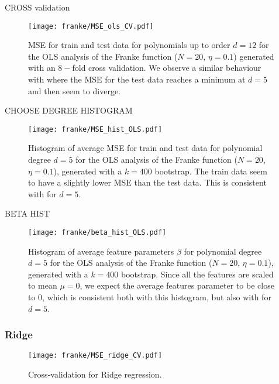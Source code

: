             
            CROSS validation 

            \begin{figure}
                \texttt{[image: franke/MSE\_ols\_CV.pdf]}
                \caption{MSE for train and test data for polynomials up to order $d=12$ for the OLS analysis of the Franke function ($N=20$, $\eta=0.1$) generated with an $8-$fold cross validation. We observe a similar behaviour with  where the MSE for the test data reaches a minimum at $d=5$ and then seem to diverge. }
                \label{fig:cross-validation_ols}
            \end{figure}
            
            CHOOSE DEGREE HISTOGRAM

            \begin{figure}
                \texttt{[image: franke/MSE\_hist\_OLS.pdf]}
                \caption{Histogram of average MSE for train and test data for polynomial degree $d=5$ for the OLS analysis of the Franke function ($N=20$, $\eta=0.1$), generated with a $k=400$ bootstrap. The train data seem to have a slightly lower MSE than the test data. This is consistent with  for $d=5$.}
                \label{fig:mse_hist_ols}
            \end{figure}

            BETA  HIST

            \begin{figure}
                \texttt{[image: franke/beta\_hist\_OLS.pdf]}
                \caption{Histogram of average feature parameters $\beta$ for polynomial degree $d=5$ for the OLS analysis of the Franke function ($N=20$, $\eta=0.1$), generated with a $k=400$ bootstrap. Since all the features are scaled to mean $\mu=0$, we expect the average features parameter to be close to 0, which is consistent both with this histogram, but also with  for $d=5$. }
                \label{fig:beta_hist_ols}
            \end{figure}
            


        

        \subsubsection{Ridge}\label{sec:rigdeanalysis}

        \begin{figure}
            \texttt{[image: franke/MSE\_ridge\_CV.pdf]}
            \caption{Cross-validation for Ridge regression.}
            \label{fig:cross-validation_ridge}
        \end{figure}

